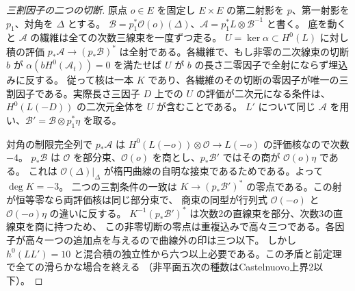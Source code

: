 \begin{proof}[三割因子の二つの切断]
原点 $o\in E$ を固定し $E\times E$ の第二射影を $p$、第一射影を $p_1$、対角を $\Delta$ とする。
$\mathcal B=p_1^*\mathcal O(o)(\Delta)$、$\mathcal A=p_1^*L\otimes\mathcal B^{-1}$ と書く。
底を動くと $\mathcal A$ の繊維は全ての次数三線束を一度ずつ走る。
$U=\ker\alpha\subset H^0(L)$ に対し積の評価
$p_*\mathcal A\to(p_*\mathcal B)^*$ は全射である。各繊維で、もし非零の二次線束の切断 $b$ が
$\alpha(b H^0(\mathcal A_t))=0$ を満たせば $U$ が $b$ の長さ二零因子で全射にならず埋込みに反する。
従って核は一本 $K$ であり、各繊維のその切断の零因子が唯一の三割因子である。実際長さ三因子 $D$ 上での
$U$ の評価が二次元になる条件は、$H^0(L(-D))$ の二次元全体を $U$ が含むことである。
$L'$ について同じ $\mathcal A$ を用い、$\mathcal B'=\mathcal B\otimes p_1^*\eta$ を取る。

対角の制限完全列で $p_*\mathcal A$ は $H^0(L(-o))\otimes\mathcal O\to L(-o)$ の評価核なので次数 $-4$。
$p_*\mathcal B$ は $\mathcal O$ を部分束、$\mathcal O(o)$ を商とし、$p_*\mathcal B'$ ではその商が $\mathcal O(o)\eta$ である。
これは $\mathcal O(\Delta)|_\Delta$ が楕円曲線の自明な接束であるためである。よって $\deg K=-3$。
二つの三割条件の一致は $K\to (p_*\mathcal B')^*$ の零点である。この射が恒等零なら両評価核は同じ部分束で、
商束の同型が行列式 $\mathcal O(-o)$ と $\mathcal O(-o)\eta$ の違いに反する。
$K^{-1}(p_*\mathcal B')^*$ は次数2の直線束を部分、次数3の直線束を商に持つため、
この非零切断の零点は重複込みで高々三つである。各因子が高々一つの追加点を与えるので曲線外の印は三つ以下。
しかし $h^0(LL')=10$ と混合積の独立性から六つ以上必要である。この矛盾と前定理で全ての滑らかな場合を終える
（非平面五次の種数はCastelnuovo上界2以下）。
\end{proof}
